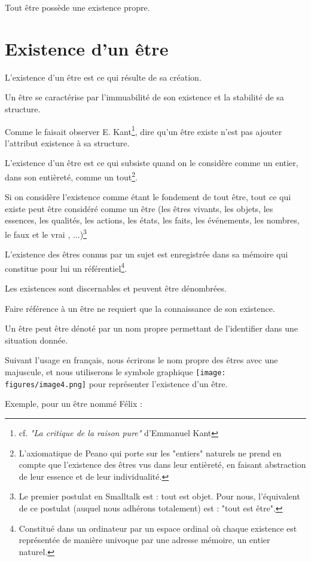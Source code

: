 \documentclass[a4paper, 12pt, openright, french]{book}
\begin{document}
Tout être possède une existence propre.


\section{Existence d'un être}

L'existence d'un être est ce qui résulte
de sa création.

Un être se caractérise par l'immuabilité de son
existence et la stabilité de sa structure.

Comme le faisait observer E. Kant\footnote{cf. \emph{"La critique de la raison pure"} d'Emmanuel Kant}, dire qu'un être existe n'est pas ajouter
l'attribut existence à sa structure.

L'existence d'un être est ce qui
subsiste quand on le considère comme un entier, dans son entièreté,
comme un tout\footnote{L'axiomatique de Peano qui porte sur
	les "entiers" naturels ne prend en compte que
	l'existence des êtres vus dans leur entièreté, en
	faisant abstraction de leur essence et de leur individualité.}.

Si on considère l'existence comme étant le fondement de
tout être, tout ce qui existe peut être considéré comme un être (les
êtres vivants, les objets, les essences, les qualités, les actions, les
états, les faits, les événements, les nombres, le faux et le vrai ,
...)\footnote{Le premier postulat en Smalltalk est : tout est
	objet. Pour nous, l'équivalent de ce postulat (auquel
	nous adhérons totalement) est : "tout est être".}

L'existence des êtres connus par un sujet est
enregistrée dans sa mémoire qui constitue pour lui un
référentiel\footnote{Constitué dans un ordinateur par un espace ordinal
	où chaque existence est représentée de manière univoque par une adresse
	mémoire, un entier naturel.}.

Les existences sont discernables et peuvent être dénombrées.

Faire référence à un être ne requiert que la connaissance de son
existence.

Un être peut être dénoté par un nom propre permettant de
l'identifier dans une situation donnée.

Suivant l'usage en français, nous écrirons le nom
propre des êtres avec une majuscule, et nous utiliserons le symbole
graphique
\texttt{[image: figures/image4.png]}
pour représenter l'existence d'un être.

Exemple, pour un être nommé Félix :
\end{document}
